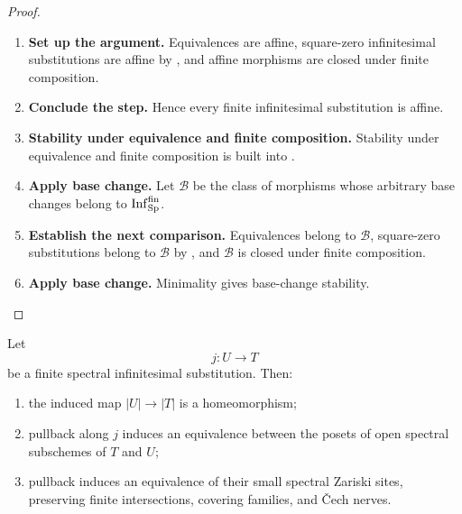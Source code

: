\begin{proof}
\leavevmode
\begin{enumerate}[label=\textup{(\arabic*)}]
    \item \textbf{Set up the argument.}
    Equivalences are affine, square-zero infinitesimal substitutions are affine by
    , and affine morphisms are closed under finite
    composition.

    \item \textbf{Conclude the step.}
    Hence every finite infinitesimal substitution is affine.

    \item \textbf{Stability under equivalence and finite composition.}
    Stability under equivalence and finite composition is built into
    .

    \item \textbf{Apply base change.}
    Let \(\mathcal B\) be the class of morphisms whose arbitrary base changes belong to
    \(\operatorname{Inf}^{\mathrm{fin}}_{\operatorname{Sp}}\).

    \item \textbf{Establish the next comparison.}
    Equivalences belong to \(\mathcal B\), square-zero substitutions belong to \(\mathcal B\) by
    , and \(\mathcal B\) is closed under finite
    composition.

    \item \textbf{Apply base change.}
    Minimality gives base-change stability.
\end{enumerate}
\end{proof}

\begin{proposition}
\label{prop:finite-infinitesimal-zariski-invariance}
Let
\[
    j:U\longrightarrow T
\]
be a finite spectral infinitesimal substitution. Then:
\begin{enumerate}[label=(\roman*)]
    \item the induced map \(|U|\to|T|\) is a homeomorphism;
    \item pullback along \(j\) induces an equivalence between the posets of
    open spectral subschemes of \(T\) and \(U\);
    \item pullback induces an equivalence of their small spectral Zariski
    sites, preserving finite intersections, covering families, and \v{C}ech
    nerves.
\end{enumerate}
\end{proposition}

